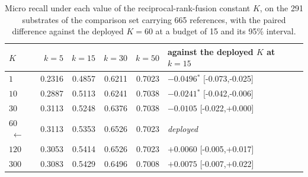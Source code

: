 \begin{table}[h]
\centering\small
\begin{threeparttable}
\caption{Micro recall under each value of the reciprocal-rank-fusion constant $K$, on the 291 substrates of the comparison set carrying 665 references, with the paired difference against the deployed $K=60$ at a budget of 15 and its 95\% interval.}
\label{tab:si-fusion-k}
\begin{tabular}{lrrrrl}
\toprule
$K$ & $k=5$ & $k=15$ & $k=30$ & $k=50$ & against the deployed $K$ at $k=15$ \\
\midrule
$1$ & 0.2316 & 0.4857 & 0.6211 & 0.7023 & $-0.0496$$^{*}$ {\scriptsize [-0.073,-0.025]} \\
$10$ & 0.2887 & 0.5113 & 0.6241 & 0.7038 & $-0.0241$$^{*}$ {\scriptsize [-0.042,-0.006]} \\
$30$ & 0.3113 & 0.5248 & 0.6376 & 0.7038 & $-0.0105$\phantom{$^{*}$} {\scriptsize [-0.022,+0.000]} \\
$60$$\;\leftarrow$ & 0.3113 & 0.5353 & 0.6526 & 0.7023 & \emph{deployed} \\
$120$ & 0.3053 & 0.5414 & 0.6526 & 0.7023 & $+0.0060$\phantom{$^{*}$} {\scriptsize [-0.005,+0.017]} \\
$300$ & 0.3083 & 0.5429 & 0.6496 & 0.7008 & $+0.0075$\phantom{$^{*}$} {\scriptsize [-0.007,+0.022]} \\
\bottomrule
\end{tabular}


\end{threeparttable}
\end{table}
